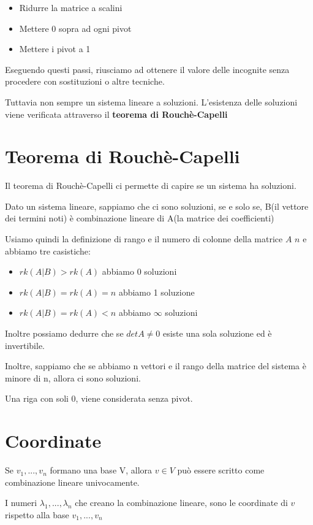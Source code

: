\documentclass[a4paper, 10pt]{article}
\begin{document}
\begin{itemize}
	\item Ridurre la matrice a scalini
	\item Mettere 0 sopra ad ogni pivot
	\item Mettere i pivot a 1
\end{itemize}

Eseguendo questi passi, riusciamo ad ottenere il valore delle incognite senza procedere con sostituzioni o altre tecniche.

Tuttavia non sempre un sistema lineare a soluzioni. L'esistenza delle soluzioni viene verificata attraverso il \textbf{teorema di Rouchè-Capelli}

\section{Teorema di Rouchè-Capelli}

Il teorema di Rouchè-Capelli ci permette di capire se un sistema ha soluzioni. 

Dato un sistema lineare, sappiamo che ci sono soluzioni, se e solo se, B(il vettore dei termini noti) è combinazione lineare di A(la matrice dei coefficienti)

Usiamo quindi la definizione di rango e il numero di colonne della matrice $A$ $n$ e abbiamo tre casistiche:

\begin{itemize}
	\item $rk(A|B) > rk(A)$ abbiamo 0 soluzioni
	\item $rk(A|B) = rk(A) = n$ abbiamo 1 soluzione
	\item $rk(A|B) = rk(A) < n$ abbiamo $\infty$ soluzioni
\end{itemize}

Inoltre possiamo dedurre che se $ detA \neq 0$ esiste una sola soluzione ed è invertibile.

Inoltre, sappiamo che se abbiamo n vettori e il rango della matrice del sistema è minore di n, allora ci sono soluzioni.

Una riga con soli 0, viene considerata senza pivot.

\section{Coordinate}

Se $v_1, ..., v_n$ formano una base V, allora $v \in V$ può essere scritto come combinazione lineare univocamente.

I numeri $\lambda_1, ..., \lambda_n$ che creano la combinazione lineare, sono le coordinate di $v$ rispetto alla base $v_1, ..., v_n$
\end{document}
